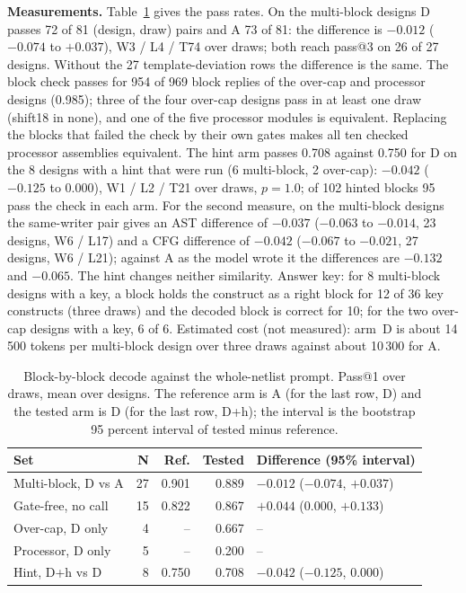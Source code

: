\documentclass[conference]{IEEEtran}
\newcommand{\hev}[1]{\par\smallskip\noindent\textbf{#1}}
\begin{document}
\hev{Measurements.} Table~\ref{tab:ql10} gives the pass rates. On the multi-block designs D passes 72 of 81 (design, draw) pairs and A 73 of 81: the difference is $-0.012$ ($-0.074$ to $+0.037$), W3 / L4 / T74 over draws; both reach pass@3 on 26 of 27 designs. Without the 27 template-deviation rows the difference is the same. The block check passes for 954 of 969 block replies of the over-cap and processor designs (0.985); three of the four over-cap designs pass in at least one draw (shift18 in none), and one of the five processor modules is equivalent. Replacing the blocks that failed the check by their own gates makes all ten checked processor assemblies equivalent. The hint arm passes 0.708 against 0.750 for D on the 8 designs with a hint that were run (6 multi-block, 2 over-cap): $-0.042$ ($-0.125$ to $0.000$), W1 / L2 / T21 over draws, $p=1.0$; of 102 hinted blocks 95 pass the check in each arm. For the second measure, on the multi-block designs the same-writer pair gives an AST difference of $-0.037$ ($-0.063$ to $-0.014$, 23 designs, W6 / L17) and a CFG difference of $-0.042$ ($-0.067$ to $-0.021$, 27 designs, W6 / L21); against A as the model wrote it the differences are $-0.132$ and $-0.065$. The hint changes neither similarity. Answer key: for 8 multi-block designs with a key, a block holds the construct as a right block for 12 of 36 key constructs (three draws) and the decoded block is correct for 10; for the two over-cap designs with a key, 6 of 6. Estimated cost (not measured): arm~D is about 14\,500 tokens per multi-block design over three draws against about 10\,300 for A.

\begin{table}[t]
\caption{Block-by-block decode against the whole-netlist prompt. Pass@1 over draws, mean over designs. The reference arm is A (for the last row, D) and the tested arm is D (for the last row, D+h); the interval is the bootstrap 95 percent interval of tested minus reference.}
\label{tab:ql10}
\centering
\footnotesize
\begin{tabular}{@{}lrrrl@{}}
\toprule
Set & N & Ref. & Tested & Difference (95\% interval) \\
\midrule
Multi-block, D vs A & 27 & 0.901 & 0.889 & $-0.012$ ($-0.074$, $+0.037$) \\
Gate-free, no call & 15 & 0.822 & 0.867 & $+0.044$ (0.000, $+0.133$) \\
Over-cap, D only & 4 & -- & 0.667 & -- \\
Processor, D only & 5 & -- & 0.200 & -- \\
Hint, D+h vs D & 8 & 0.750 & 0.708 & $-0.042$ ($-0.125$, 0.000) \\
\bottomrule
\end{tabular}
\end{table}
\end{document}
